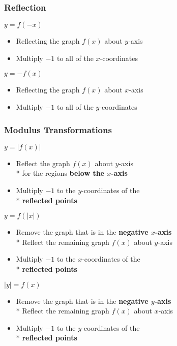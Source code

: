 \documentclass[../main.tex]{subfiles}
\begin{document}
\subsubsection{Reflection}
\underline{\(y=f(-x)\)}
\begin{itemize}
    \item Reflecting the graph \(f(x)\) about \(y\)-axis
    \item Multiply \(-1\) to all of the \(x\)-coordinates
\end{itemize}
\underline{\(y=-f(x)\)}
\begin{itemize}
    \item Reflecting the graph \(f(x)\) about \(x\)-axis
    \item Multiply \(-1\) to all of the \(y\)-coordinates
\end{itemize}

\subsubsection{Modulus Transformations}
\underline{\(y=|f(x)|\)}
\begin{itemize}
    \item Reflect the graph \(f(x)\) about \(y\)-axis \\* for the regions \textbf{below the \(x\)-axis}
    \item Multiply \(-1\) to the \(y\)-coordinates of the \\* \textbf{reflected points}
\end{itemize}
\underline{\(y=f(|x|)\)}
\begin{itemize}
    \item Remove the graph that is in the \textbf{negative \(x\)-axis} \\* Reflect the remaining graph \(f(x)\) about \(y\)-axis
    \item Multiply \(-1\) to the \(x\)-coordinates of the \\* \textbf{reflected points}
\end{itemize}
\underline{\(|y|=f(x)\)}
\begin{itemize}
    \item Remove the graph that is in the \textbf{negative \(y\)-axis} \\* Reflect the remaining graph \(f(x)\) about \(x\)-axis
    \item Multiply \(-1\) to the \(y\)-coordinates of the \\* \textbf{reflected points}
\end{itemize}
\newpage \noindent
\end{document}
